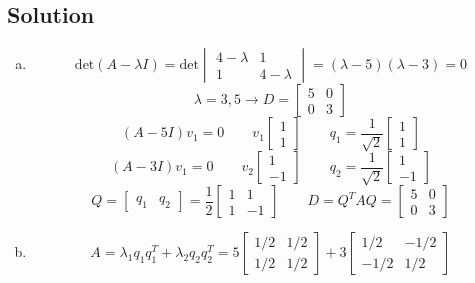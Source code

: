 \subsection*{Solution}
\begin{enumerate}[(a)]
    \item \[\text{det}(A-\lambda I)=\text{det}\begin{vmatrix}
                  4-\lambda & 1         \\
                  1         & 4-\lambda
              \end{vmatrix}=(\lambda-5)(\lambda-3)=0\]
          \[\lambda=3,5 \to D=\begin{bmatrix}
                  5 & 0 \\
                  0 & 3
              \end{bmatrix}\]
          \[(A-5I)v_1=0 \qquad v_1\begin{bmatrix}
                  1 \\1
              \end{bmatrix} \qquad q_1=\frac{1}{\sqrt{2}}\begin{bmatrix}
                  1 \\1
              \end{bmatrix}\]
          \[(A-3I)v_1=0 \qquad v_2\begin{bmatrix}
                  1 \\-1
              \end{bmatrix} \qquad q_2=\frac{1}{\sqrt{2}}\begin{bmatrix}
                  1 \\-1
              \end{bmatrix}\]
          \[Q=\begin{bmatrix}
                  q_1 & q_2
              \end{bmatrix}=\frac{1}{2}\begin{bmatrix}
                  1 & 1  \\
                  1 & -1
              \end{bmatrix} \qquad D=Q^TAQ=\begin{bmatrix}
                  5 & 0 \\
                  0 & 3
              \end{bmatrix}\]
    \item \[A=\lambda_1 q_1 q_1^T+\lambda_2 q_2 q_2^T=5\begin{bmatrix}
                  1/2 & 1/2 \\
                  1/2 & 1/2
              \end{bmatrix} + 3\begin{bmatrix}
                  1/2  & -1/2 \\
                  -1/2 & 1/2
              \end{bmatrix}\]
\end{enumerate}

